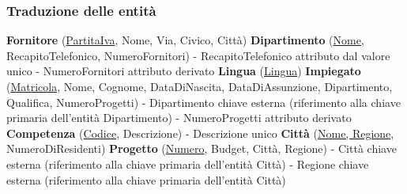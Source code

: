 \documentclass{article}
\begin{document}
\subsubsection{Traduzione delle entità}
\textbf{Fornitore} (\underline{PartitaIva}, Nome, Via, Civico, Città)
\newline
\newline
\textbf{Dipartimento} (\underline{Nome}, RecapitoTelefonico, NumeroFornitori)
\newline
- RecapitoTelefonico attributo dal valore unico
\newline
- NumeroFornitori attributo derivato
\newline
\newline
\textbf{Lingua} (\underline{Lingua})
\newline
\newline
\textbf{Impiegato} (\underline{Matricola}, Nome, Cognome, DataDiNascita, DataDiAssunzione, Dipartimento, Qualifica, NumeroProgetti)
\newline
- Dipartimento chiave esterna (riferimento alla chiave primaria dell'entità Dipartimento)
\newline
- NumeroProgetti attributo derivato
\newline
\newline
\textbf{Competenza} (\underline{Codice}, Descrizione)
\newline
- Descrizione unico
\newline
\newline
\textbf{Città} (\underline{Nome, Regione}, NumeroDiResidenti)
\newline
\newline
\textbf{Progetto} (\underline{Numero}, Budget, Città, Regione)
\newline
- Città chiave esterna (riferimento alla chiave primaria dell'entità Città)
\newline
- Regione chiave esterna (riferimento alla chiave primaria dell'entità Città)
\end{document}
